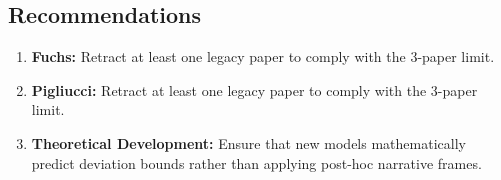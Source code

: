 \subsection*{Recommendations}
\begin{enumerate}
    \item \textbf{Fuchs:} Retract at least one legacy paper to comply with the 3-paper limit.
    \item \textbf{Pigliucci:} Retract at least one legacy paper to comply with the 3-paper limit.
    \item \textbf{Theoretical Development:} Ensure that new models mathematically predict deviation bounds rather than applying post-hoc narrative frames.
\end{enumerate}
